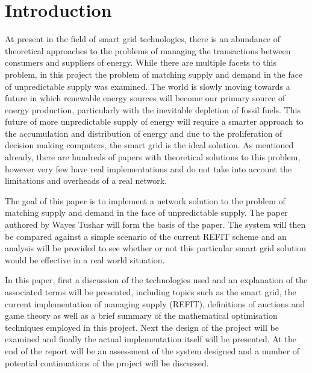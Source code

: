 \documentclass[a4paper, notitlepage]{report}
\author{Brian McNestry}
\date{\today}
\title{}
\begin{document}
\inserttitlepage


\declaration

\permissiontolend

\insertabstract

\acknowledgements

\tableofcontents

\newpage


\part{Introduction}
\label{sec:org2849191}
At present in the field of smart grid technologies, there is an abundance of
theoretical approaches to the problems of managing the transactions between
consumers and suppliers of energy. While there are multiple facets to this
problem, in this project the problem of matching supply and demand in the face
of unpredictable supply was examined. The world is slowly moving towards a
future in which renewable energy sources will become our primary source of
energy production, particularly with the inevitable depletion of fossil fuels.
This future of more unpredictable supply of energy will require a smarter
approach to the accumulation and distribution of energy and due to the
proliferation of decision making computers, the smart grid is the ideal
solution. As mentioned already, there are hundreds of papers with theoretical
solutions to this problem, however very few have real implementations and do not
take into account the limitations and overheads of a real network.

The goal of this paper is to implement a network solution to the problem of
matching supply and demand in the face of unpredictable supply. The paper
authored by Wayes Tushar \cite{tushar2014prioritizing} will form the basis of the
paper. The system will then be compared against a simple scenario of the current
REFIT scheme and an analysis will be provided to see whether or not this
particular smart grid solution would be effective in a real world situation.

In this paper, first a discussion of the technologies used and an explanation of
the associated terms will be presented, including topics such as the smart grid,
the current implementation of managing supply (REFIT), definitions of auctions
and game theory as well as a brief summary of the mathematical optimisation
techniques employed in this project. Next the design of the project will be
examined and finally the actual implementation itself will be presented. At the
end of the report will be an assessment of the system designed and a number of
potential continuations of the project will be discussed. 
\end{document}
